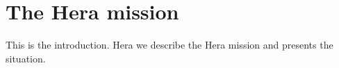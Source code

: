 \section{The Hera mission}
\label{intro}

This is the introduction. Hera we describe the Hera mission and presents the situation.
